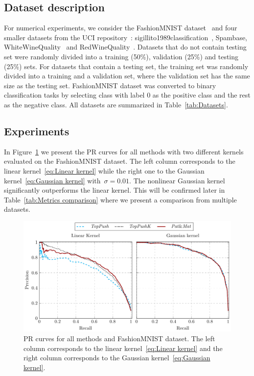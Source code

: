 \subsection{Dataset description}

For numerical experiments, we consider the FashionMNIST dataset~\cite{xiao2017fashionmnist} and four smaller datasets from the UCI repository~\cite{dua2019uci}: sigillito1989classification~\cite{sigillito1989classification}, Spambase, WhiteWineQuality~\cite{cortez2009modeling} and RedWineQuality~\cite{cortez2009modeling}. Datasets that do not contain testing set were randomly divided into a training (50\%), validation (25\%) and testing (25\%) sets. For datasets that contain a testing set, the training set was randomly divided into a training and a validation set, where the validation set has the same size as the testing set. FashionMNIST dataset was converted to binary classification tasks by selecting class with label 0 as the positive class and the rest as the negative class. All datasets are summarized in Table~\ref{tab:Datasets}.

\subsection{Experiments}

In Figure~\ref{fig:PR comparison} we present the PR curves for all methods with two different kernels evaluated on the FashionMNIST dataset. The left column corresponds to the linear kernel~\eqref{eq:Linear kernel} while the right one to the Gaussian kernel~\eqref{eq:Gaussian kernel} with~$\sigma = 0.01$. The nonlinear Gaussian kernel significantly outperforms the linear kernel. This will be confirmed later in Table~\ref{tab:Metrics comparison} where we present a comparison from multiple datasets. 

\begin{figure}[!ht]
  \centering
  \includegraphics[width = \linewidth]{images/dual_results1.pdf}
  \caption{PR curves for all methods and  FashionMNIST dataset. The left column corresponds to the linear kernel~\eqref{eq:Linear kernel} and the right column corresponds to the Gaussian kernel~\eqref{eq:Gaussian kernel}.}
  \label{fig:PR comparison}
\end{figure}


